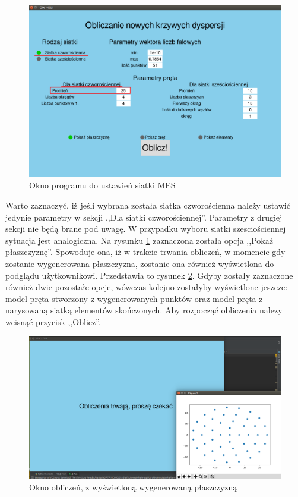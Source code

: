 \begin{figure}[h]
\centering
\includegraphics[width=13cm]{Zdjecia/5/kasia/srednica25}
\caption{Okno programu do ustawień siatki MES}
\label{fig:srednica25}
\end{figure}

Warto zaznaczyć, iż jeśli wybrana została siatka czworościenna należy ustawić jedynie parametry w sekcji ,,Dla siatki czworościennej''. Parametry z drugiej sekcji nie będą brane pod uwagę. W przypadku wyboru siatki szesciościennej sytuacja jest analogiczna. Na rysunku \ref{fig:srednica25} zaznaczona została opcja ,,Pokaż płaszczyznę''. Spowoduje ona, iż w trakcie trwania obliczeń, w momencie gdy zostanie wygenerowana płaszczyzna, zostanie ona również wyświetlona do podglądu użytkownikowi. Przedstawia to rysunek \ref{fig:plaszczyzna}. Gdyby zostały zaznaczone również dwie pozostałe opcje, wówczas kolejno zostałyby wyświetlone jeszcze: model pręta stworzony z wygenerowanych punktów oraz model pręta z narysowaną siatką elementów skończonych. Aby rozpocząć obliczenia nalezy wcisnąć przycisk ,,Oblicz''.

\begin{figure}[h]
\centering
\includegraphics[width=13cm]{Zdjecia/5/kasia/plaszczyzna}
\caption{Okno obliczeń, z wyświetloną wygenerowaną płaszczyzną}
\label{fig:plaszczyzna}
\end{figure}

